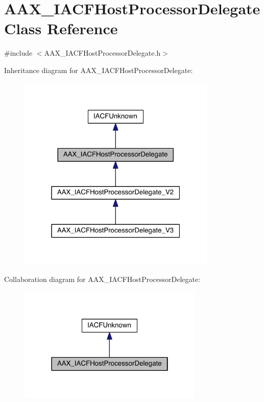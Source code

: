\hypertarget{a00068}{}\section{A\+A\+X\+\_\+\+I\+A\+C\+F\+Host\+Processor\+Delegate Class Reference}
\label{a00068}


{\ttfamily \#include $<$A\+A\+X\+\_\+\+I\+A\+C\+F\+Host\+Processor\+Delegate.\+h$>$}



Inheritance diagram for A\+A\+X\+\_\+\+I\+A\+C\+F\+Host\+Processor\+Delegate\+:
\nopagebreak
\begin{figure}[H]
\begin{center}
\leavevmode
\includegraphics[width=268pt]{a00547}
\end{center}
\end{figure}


Collaboration diagram for A\+A\+X\+\_\+\+I\+A\+C\+F\+Host\+Processor\+Delegate\+:
\nopagebreak
\begin{figure}[H]
\begin{center}
\leavevmode
\includegraphics[width=250pt]{a00548}
\end{center}
\end{figure}


